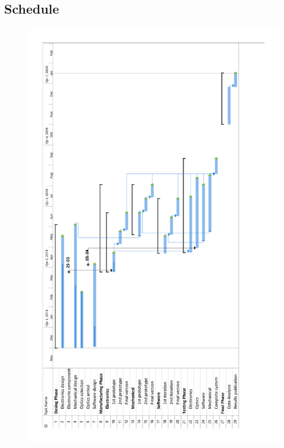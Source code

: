\begin{landscape}

\subsection{Schedule}
\begin{figure}[H]

\includegraphics[scale=0.7,angle=270]{3-project-planning/img/Gantt1.pdf}
\end{figure}

\end{landscape}

